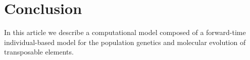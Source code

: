 \documentclass{bioinfo}
\begin{document}
\begin{methods}
\begin{enumerate}
\end{enumerate}





\end{methods}








%
%


\section{Conclusion}

In this article we describe a computational model composed of a
forward-time individual-based model for the population genetics and
molecular evolution of transposable elements.
\end{document}
